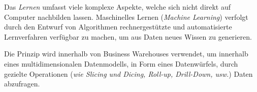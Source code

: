 






















%
{}%
{Das \textit{Lernen} umfasst viele komplexe Aspekte, welche sich nicht direkt auf Computer nachbilden lassen. Maschinelles Lernen (\textit{Machine Learning}) verfolgt durch den Entwurf von Algorithmen rechnergestützte und automatisierte Lernverfahren verfügbar zu machen, um aus Daten neues Wissen zu generieren.}

%
{}%
{Die Prinzip wird innerhalb von Business Warehouses verwendet, um innerhalb eines multidimensionalen Datenmodells, in Form eines Datenwürfels, durch gezielte Operationen (\textit{wie Slicing und Dicing, Roll-up, Drill-Down, usw.}) Daten abzufragen.}

